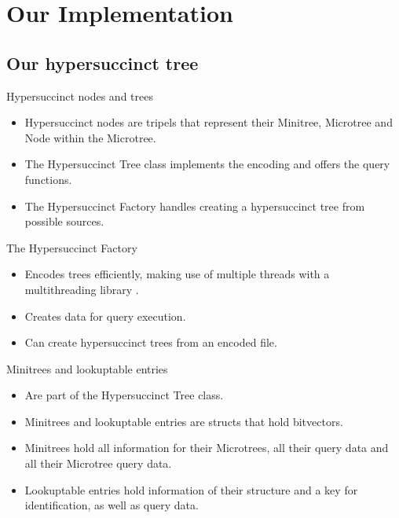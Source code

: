 \documentclass{beamer}
\begin{document}
\section{Our Implementation}

\subsection{Our hypersuccinct tree}

\begin{frame}{Hypersuccinct nodes and trees}
	\begin{itemize}
	\item
		Hypersuccinct nodes are tripels that represent their Minitree, Microtree and Node within the Microtree.
	\item
		The Hypersuccinct Tree class implements the encoding and offers the query functions.
	\item
		The Hypersuccinct Factory handles creating a hypersuccinct tree from possible sources.
	\end{itemize}
\end{frame}

\begin{frame}{The Hypersuccinct Factory}
	\begin{itemize}
	\item
		Encodes trees efficiently, making use of multiple threads with a multithreading library \cite{threading}.
	\item
		Creates data for query execution.
	\item
		Can create hypersuccinct trees from an encoded file.
	\end{itemize}
\end{frame}

\begin{frame}{Minitrees and lookuptable entries}
	\begin{itemize}
	\item
		Are part of the Hypersuccinct Tree class.
	\item
		Minitrees and lookuptable entries are structs that hold bitvectors.
	\item
		Minitrees hold all information for their Microtrees, all their query data and all their Microtree query data.
	\item
		Lookuptable entries hold information of their structure and a key for identification, as well as query data.
	\end{itemize}
\end{frame}
\end{document}
